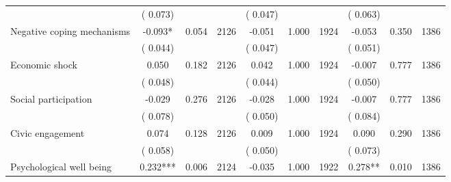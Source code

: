 \begin{tabular}{l*{9}{c}}
                               &        (       0.073) & &                                                                 &       (       0.047) & &                                                          &       (       0.063) & &  \\ 
 Negative coping mechanisms                 &             -0.093*          &        0.054 & 2126          &             -0.051 &        1.000 & 1924                   &       -0.053 &        0.350 & 1386                 \\ 
                               &        (       0.044) & &                                                                 &       (       0.047) & &                                                          &       (       0.051) & &  \\ 
 Economic shock                 &              0.050          &        0.182 & 2126          &              0.042 &        1.000 & 1924                   &       -0.007 &        0.777 & 1386                 \\ 
                               &        (       0.048) & &                                                                 &       (       0.044) & &                                                          &       (       0.050) & &   \\ 
 Social participation                 &             -0.029          &        0.276 & 2126          &             -0.028 &        1.000 & 1924                   &       -0.007 &        0.777 & 1386                 \\ 
                               &        (       0.078) & &                                                                 &       (       0.050) & &                                                          &       (       0.084) & &   \\ 
 Civic engagement                 &              0.074          &        0.128 & 2126          &              0.009 &        1.000 & 1924                   &        0.090 &        0.290 & 1386                 \\ 
                               &        (       0.058) & &                                                                 &       (       0.050) & &                                                          &       (       0.073) & &  \\ 
 Psychological well being                &              0.232***        &        0.006 & 2124        &             -0.035 &        1.000 & 1922               &        0.278** &        0.010 & 1386       \\ 

\end{tabular}

